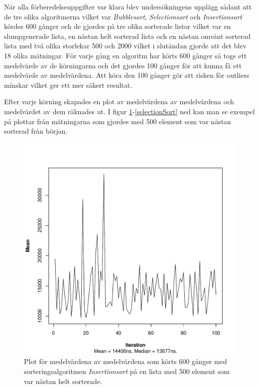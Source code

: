 \documentclass[a4paper]{article}
\begin{document}
När alla förberedelseuppgifter var klara blev undersökningens upplägg sådant att de tre olika algoritmerna vilket var \emph{Bubblesort}, \emph{Selectionsort} och \emph{Insertionsort} kördes 600 gånger och de gjordes på tre olika sorterade listor vilket var en slumpgenerade lista, en nästan helt sorterad lista och en nästan omvänt sorterad lista med två olika storlekar 500 och 2000 vilket i slutändan gjorde att det blev 18 olika mätningar. För varje gång en algoritm har körts 600 gånger så togs ett medelvärde av de körningarna och det gjordes 100 gånger för att kunna få ett medelvärde av medelvärdena. Att köra den 100 gånger gör att risken för outliers minskar vilket ger ett mer säkert resultat.

Efter varje körning skapades en plot av medelvärdena av medelvärdena och medelvärdet av dem räknades ut. I figur \ref{insertionSort}-\ref{selectionSort} ned kan man se exempel på plottar från mätningarna som gjordes med 500 element som var nästan sorterad från början.

\begin{figure}[H]
	\begin{center}
		\includegraphics[scale=0.4]{output/500/AlmostSorted/insertionSort_almost_sorted_500_600_100.pdf}
		\caption{Plot för medelvärdena av medelvärdena som körts 600 gånger med sorteringsalgoritmen \emph{Insertionsort} på en lista med 500 element som var nästan helt sorterade.}
		\label{insertionSort}
	\end{center}
\end{figure}
\end{document}
